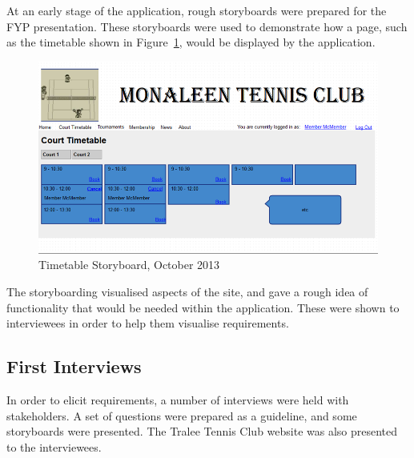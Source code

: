 At an early stage of the application, rough storyboards were prepared for the FYP presentation. These storyboards were used to demonstrate how a page, such as the timetable shown in Figure~\ref{fig:timetableSB}, would be displayed by the application.

\begin{figure}[H]
\begin{center}
\includegraphics[width=14cm]{storyboard.png}
\end{center}
\caption{Timetable Storyboard, October 2013}
\label{fig:timetableSB}
\end{figure}

The storyboarding visualised aspects of the site, and gave a rough idea of functionality that would be needed within the application. These were shown to interviewees in order to help them visualise requirements.

\subsection{First Interviews}

In order to elicit requirements, a number of interviews were held with stakeholders. A set of questions were prepared as a guideline, and some storyboards were presented. The Tralee Tennis Club website was also presented to the interviewees.

